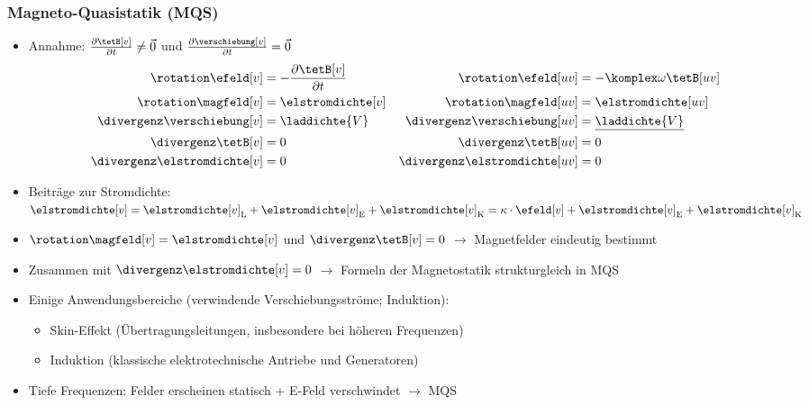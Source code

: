 \begin{frame}
  \frametitle{Magneto-Quasistatik (MQS)}
  \begin{itemize}[<+->]
  \item Annahme: $\frac{\partial \tetB[v]}{\partial t} \ne \vec{0}$ und $\frac{\partial \verschiebung[v]}{\partial t} = \vec{0}$
    \begin{align*}
 	\rotation \efeld[v] & = -\frac{\partial \tetB[v]}{\partial t}  & \rotation \efeld[uv] & = -\komplex\omega\tetB[uv] \\
 	\rotation \magfeld[v] & = \elstromdichte[v] & \rotation \magfeld[uv] & = \elstromdichte[uv] \\
 	\divergenz \verschiebung[v] &= \laddichte{V} & \divergenz \verschiebung[uv] &= \underline{\laddichte{V}}\\
      \divergenz \tetB[v] &= 0 & \divergenz \tetB[uv] &= 0\\
      \divergenz \elstromdichte[v] &=0 & \divergenz \elstromdichte[uv] &=0
    \end{align*}
  \item Beiträge zur Stromdichte: $\elstromdichte[v] = \elstromdichte[v]_\mathrm{L} + \elstromdichte[v]_\mathrm{E} + \elstromdichte[v]_\mathrm{K} = \kappa \cdot \efeld[v] + \elstromdichte[v]_\mathrm{E} + \elstromdichte[v]_\mathrm{K} $
  \item $\rotation \magfeld[v]  = \elstromdichte[v]$ und $\divergenz \tetB[v] = 0$ $\to$ Magnetfelder eindeutig bestimmt
    \item Zusammen mit $\divergenz \elstromdichte[v] =0$ $\to$ Formeln der Magnetostatik strukturgleich in MQS 
  \item Einige Anwendungsbereiche (verwindende Verschiebungsströme; Induktion):
      \begin{itemize}[<+->]
      \item Skin-Effekt (Übertragungsleitungen, insbesondere bei höheren Frequenzen)
      \item Induktion (klassische elektrotechnische Antriebe und Generatoren)
        \end{itemize}
        \item Tiefe Frequenzen: Felder erscheinen statisch + E-Feld verschwindet $\to$ \alert{MQS}
  \end{itemize}
\end{frame}


